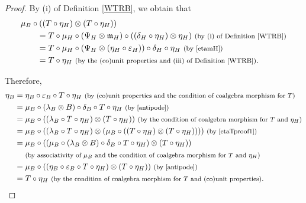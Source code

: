 \documentclass[10pt,a4paper]{amsart}
\numberwithin{equation}{section}
\begin{document}
\begin{proof}
By (i) of Definition \ref{WTRB}, we obtain that
\begin{align}
&\mu_{B}\circ((T\circ\eta_{H})\otimes (T\circ\eta_{H}))\nonumber\\
&\qquad{}=T\circ\mu_{H}\circ(\Psi_{H}\otimes\mathfrak{m}_{H})\circ((\delta_{H}\circ\eta_{H})\otimes \eta_{H})\ \text{\footnotesize\textnormal{(by (i) of Definition \ref{WTRB})}}\nonumber\\
&\qquad{}=T\circ\mu_{H}\circ(\Psi_{H}\otimes(\eta_{H}\circ\varepsilon_{H}))\circ\delta_{H}\circ\eta_{H}\ \text{\footnotesize\textnormal{(by \eqref{etamH})}}\nonumber\\
&\qquad{}=T\circ\eta_{H}\ \text{\footnotesize\textnormal{(by the (co)unit properties and (iii) of Definition \ref{WTRB})}}.\label{etaTproof1}
\end{align}

Therefore,
\begin{align*}
\eta_{B}&{}=\eta_{B}\circ\varepsilon_{B}\circ T\circ\eta_{H}\ \text{\footnotesize\textnormal{(by (co)unit properties and the condition of coalgebra morphism for $T$)}}\\
&{}=\mu_{B}\circ(\lambda_{B}\otimes B)\circ\delta_{B}\circ T\circ\eta_{H}\ \text{\footnotesize\textnormal{(by \eqref{antipode})}}\\
&{}=\mu_{B}\circ((\lambda_{B}\circ T\circ\eta_{H})\otimes (T\circ\eta_{H}))\ \text{\footnotesize\textnormal{(by the condition of coalgebra morphism for $T$ and $\eta_{H}$)}}\\
&{}=\mu_{B}\circ((\lambda_{B}\circ T\circ\eta_{H})\otimes(\mu_{B}\circ ((T\circ\eta_{H})\otimes(T\circ\eta_{H}))))\ \text{\footnotesize\textnormal{(by \eqref{etaTproof1})}}\\
&{}=\mu_{B}\circ((\mu_{B}\circ(\lambda_{B}\otimes B)\circ\delta_{B}\circ T\circ\eta_{H})\otimes(T\circ\eta_{H}))\\
&\quad{}\ \text{\footnotesize\textnormal{(by associativity of $\mu_{B}$ and the condition of coalgebra morphism for $T$ and $\eta_{H}$)}}\\
&{}=\mu_{B}\circ((\eta_{B}\circ\varepsilon_{B}\circ T\circ\eta_{H})\otimes(T\circ\eta_{H}))\ \text{\footnotesize\textnormal{(by \eqref{antipode})}}\\
&{}=T\circ\eta_{H}\ \text{\footnotesize\textnormal{(by the condition of coalgebra morphism for $T$ and (co)unit properties)}}.\tag*{\qed}
\end{align*}
\renewcommand{\qed}{}
\end{proof}
\end{document}
